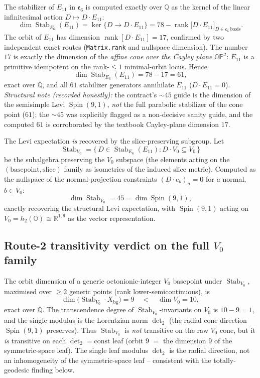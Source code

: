 The stabilizer of $E_{11}$ in $\mathfrak{e}_6$ is computed exactly over $\mathbb{Q}$
as the kernel of the linear infinitesimal action $D\mapsto D\cdot E_{11}$:
\begin{equation}
\boxed{\ \dim\operatorname{Stab}_{E_6}(E_{11}) = \ker\{D \to D \cdot E_{11}\}
= 78 - \operatorname{rank}\bigl[D\cdot E_{11}\bigr]_{D\in\mathfrak{e}_6\ \mathrm{basis}}.\ }
\label{eq:stab-kernel}
\end{equation}
The orbit of $E_{11}$ has dimension $\operatorname{rank}[D\cdot E_{11}] = 17$,
confirmed by two independent exact routes (\texttt{Matrix.rank} and nullspace
dimension). The number $17$ is exactly the dimension of the \emph{affine cone over
the Cayley plane} $\mathbb{OP}^2$: $E_{11}$ is a primitive idempotent on the
rank-$\le 1$ minimal-orbit locus. Hence
\[
\dim\operatorname{Stab}_{E_6}(E_{11}) = 78 - 17 = 61,
\]
exact over $\mathbb{Q}$, and all $61$ stabilizer generators annihilate $E_{11}$
($D\cdot E_{11}=0$). \emph{Structural note (recorded honestly):} the contract's
$\sim 45$ guide is the dimension of the semisimple Levi $\operatorname{Spin}(9,1)$,
\emph{not} the full parabolic stabilizer of the cone point ($61$); the $\sim 45$ was
explicitly flagged as a non-decisive sanity guide, and the computed $61$ is
corroborated by the textbook Cayley-plane dimension $17$.

The Levi expectation \emph{is} recovered by the slice-preserving subgroup. Let
\[
\operatorname{Stab}_{V_0} = \{\,D\in\operatorname{Stab}_{E_6}(E_{11}) : D\cdot V_0\subseteq V_0\,\}
\]
be the subalgebra preserving the $V_0$ subspace (the elements acting on the
$(\text{basepoint},\text{slice})$ family as isometries of the induced slice metric).
Computed as the nullspace of the normal-projection constraints
$(D\cdot e_b)_a = 0$ for $a$ normal, $b\in V_0$:
\[
\dim\operatorname{Stab}_{V_0} = 45 = \dim\operatorname{Spin}(9,1),
\]
exactly recovering the structural Levi expectation, with $\operatorname{Spin}(9,1)$
acting on $V_0 = h_2(\mathbb{O}) \cong \mathbb{R}^{1,9}$ as the vector representation.

\subsection{Route-2 transitivity verdict on the full $V_0$ family}

The orbit dimension of a generic octonionic-integer $V_0$ basepoint under
$\operatorname{Stab}_{V_0}$, maximised over $\ge 2$ generic points (rank
lower-semicontinuous), is
\[
\dim\bigl(\operatorname{Stab}_{V_0}\!\cdot X_{\mathrm{bg}}\bigr) = 9
\quad<\quad \dim V_0 = 10 ,
\]
exact over $\mathbb{Q}$. The transcendence degree of $\operatorname{Stab}_{V_0}$-invariants
on $V_0$ is $10-9=1$, and the single modulus is the Lorentzian norm $\det_2$ (the
radial cone direction $\operatorname{Spin}(9,1)$ preserves). Thus
$\operatorname{Stab}_{V_0}$ is \emph{not} transitive on the raw $V_0$ cone, but it
\emph{is} transitive on each $\det_2=\text{const}$ leaf (orbit $9$ $=$ the dimension
$9$ of the symmetric-space leaf). The single leaf modulus $\det_2$ is the radial
direction, not an inhomogeneity of the symmetric-space leaf -- consistent with the
totally-geodesic finding below.

